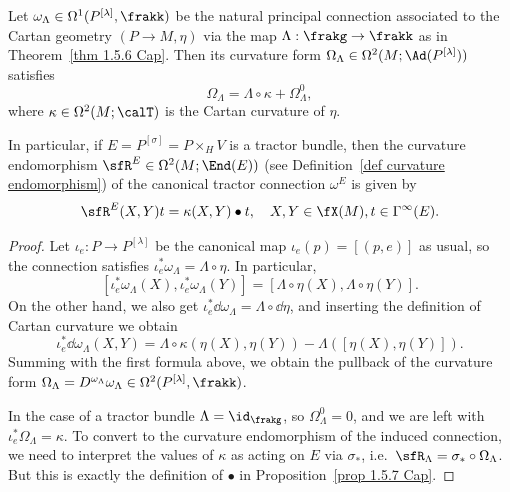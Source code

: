 
\begin{cor}\label{cor 1.5.7 Cap}
    Let $\omega_\Lambda\in\Omega^1(P^{[\lambda]},\frakk)$ be the natural principal connection associated to the Cartan geometry $(P\to M,\eta)$ via the map $\Lambda:\frakg\to\frakk$ as in Theorem~\ref{thm 1.5.6 Cap}. Then its curvature form $\Omega_\Lambda\in\Omega^2(M;\Ad(P^{[\lambda]}))$ satisfies 
    \[\Omega_\Lambda=\Lambda\circ\kappa+\Omega^0_\Lambda,\]
    where $\kappa\in\Omega^2(M;\calT)$ is the Cartan curvature of $\eta$.

    In particular, if $E=P^{[\sigma]}=P\times_H V$ is a tractor bundle, then the curvature endomorphism $\sfR^E\in\Omega^2(M;\End(E))$ (see Definition~\ref{def curvature endomorphism}) of the canonical tractor connection $\omega^E$ is given by 
    \[\sfR^E(X,Y)t=\kappa(X,Y)\bullet t,\quad X,Y\in\fX(M),t\in\Gamma^\infty(E).\]
\end{cor}
\begin{proof}
    Let $\iota_e:P\to P^{[\lambda]}$ be the canonical map $\iota_e(p)=[(p,e)]$ as usual, so the connection satisfies $\iota_e^\ast\omega_\Lambda=\Lambda\circ\eta$. In particular,
    \[[\iota_e^\ast\omega_\Lambda(X),\iota_e^\ast\omega_\Lambda(Y)]=[\Lambda\circ\eta(X),\Lambda\circ\eta(Y)].\]
    On the other hand, we also get $\iota_e^\ast\dd\omega_\Lambda=\Lambda\circ\dd\eta$, and inserting the definition of Cartan curvature we obtain 
    \[\iota_e^\ast\dd\omega_\Lambda(X,Y)=\Lambda\circ\kappa(\eta(X),\eta(Y))-\Lambda([\eta(X),\eta(Y)]).\]
    Summing with the first formula above, we obtain the pullback of the curvature form $\Omega_\Lambda=D^{\omega_\Lambda}\omega_\Lambda\in \Omega^2(P^{[\lambda]},\frakk)$.

    In the case of a tractor bundle $\Lambda=\id_\frakg$, so $\Omega^0_\Lambda=0$, and we are left with $\iota_e^\ast\Omega_\Lambda=\kappa$. To convert to the curvature endomorphism of the induced connection, we need to interpret the values of $\kappa$ as acting on $E$ via $\sigma_\ast$, i.e.\ $\sfR_\Lambda=\sigma_\ast\circ \Omega_\Lambda$. But this is exactly the definition of $\bullet$ in Proposition~\ref{prop 1.5.7 Cap}.
\end{proof}

